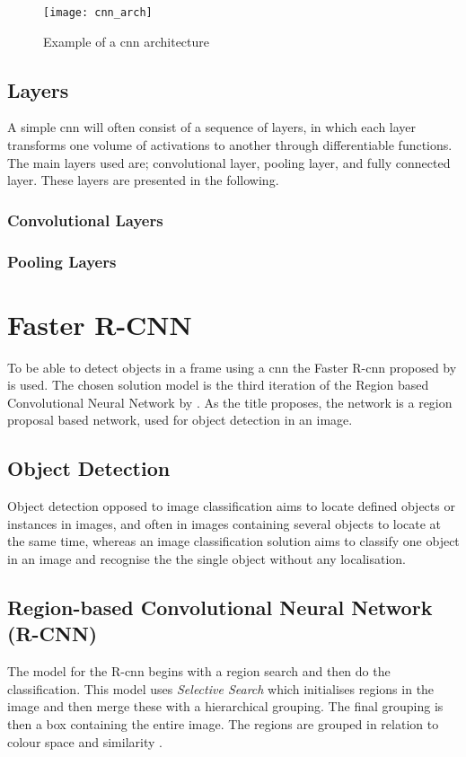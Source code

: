 \begin{figure}[H]
	\centering
	\texttt{[image: cnn\_arch]}
	\caption{Example of a \gls{cnn} architecture}
	\label{fig:cnn_arch}
\end{figure}

\subsection{Layers}
A simple \gls{cnn} will often consist of a sequence of layers, in which each layer transforms one volume of activations to another through differentiable functions. The main layers used are; convolutional layer, pooling layer, and fully connected layer. These layers are presented in the following.

\subsubsection{Convolutional Layers}


\subsubsection{Pooling Layers}


\section{Faster R-CNN}
To be able to detect objects in a frame using a \gls{cnn} the Faster R-\gls{cnn} proposed by \cite{Ren2017} is used. The chosen solution model is the third iteration of the Region based Convolutional Neural Network by \cite{Girshick2014}. As the title proposes, the network is a region proposal based network, used for object detection in an image.

\subsection{Object Detection}
Object detection opposed to image classification aims to locate defined objects or instances in images, and often in images containing several objects to locate at the same time, whereas an image classification solution aims to classify one object in an image and recognise the the single object without any localisation.

\subsection{Region-based Convolutional Neural Network (R-CNN)} 
The model for the R-\gls{cnn} begins with a region search and then do the classification. This model uses \textit{Selective Search} which initialises regions in the image and then merge these with a hierarchical grouping. The final grouping is then a box containing the entire image. The regions are grouped in relation to colour space and similarity \citep{Girshick2014}.

